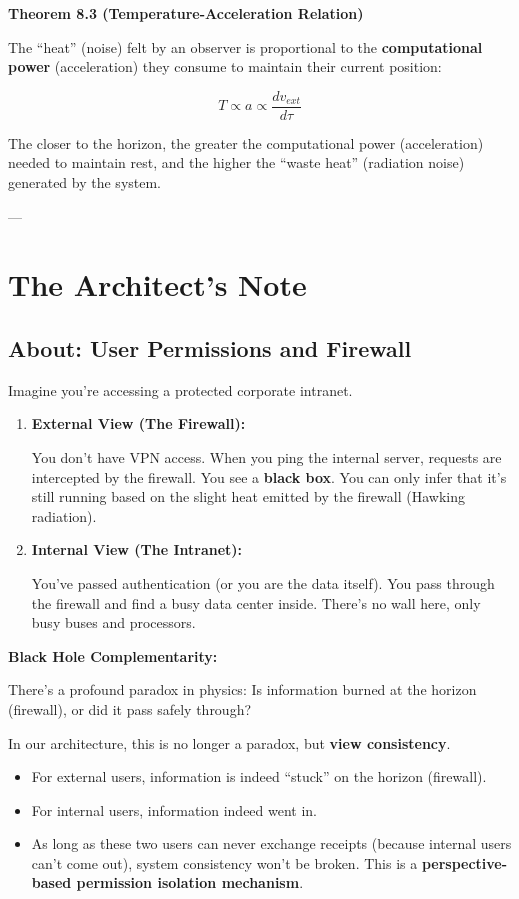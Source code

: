 \documentclass[11pt,a4paper,twoside]{book}
\begin{document}
\textbf{Theorem 8.3 (Temperature-Acceleration Relation)}

The ``heat'' (noise) felt by an observer is proportional to the \textbf{computational power} (acceleration) they consume to maintain their current position:

$$T \propto a \propto \frac{d v_{ext}}{d\tau}$$

The closer to the horizon, the greater the computational power (acceleration) needed to maintain rest, and the higher the ``waste heat'' (radiation noise) generated by the system.

---

\section{The Architect's Note}

\subsection{About: User Permissions and Firewall}

Imagine you're accessing a protected corporate intranet.

\begin{enumerate}
\item \textbf{External View (The Firewall):}

    You don't have VPN access. When you ping the internal server, requests are intercepted by the firewall. You see a \textbf{black box}. You can only infer that it's still running based on the slight heat emitted by the firewall (Hawking radiation).

\item \textbf{Internal View (The Intranet):}

    You've passed authentication (or you are the data itself). You pass through the firewall and find a busy data center inside. There's no wall here, only busy buses and processors.
\end{enumerate}

\textbf{Black Hole Complementarity:}

There's a profound paradox in physics: Is information burned at the horizon (firewall), or did it pass safely through?

In our architecture, this is no longer a paradox, but \textbf{view consistency}.

\begin{itemize}
\item For external users, information is indeed ``stuck'' on the horizon (firewall).

\item For internal users, information indeed went in.

\item As long as these two users can never exchange receipts (because internal users can't come out), system consistency won't be broken. This is a \textbf{perspective-based permission isolation mechanism}.
\end{itemize}
\end{document}
